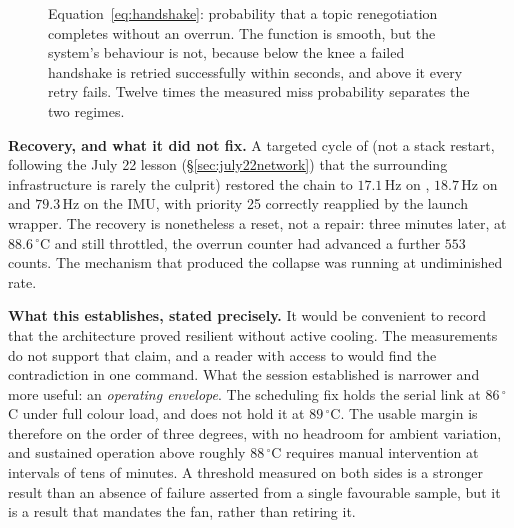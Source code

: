 \begin{figure}[htbp]
\centering
{}
\caption[Handshake cliff]{Equation~\ref{eq:handshake}: probability that a
 topic renegotiation completes without an overrun. The
function is smooth, but the system's behaviour is not, because below the knee
a failed handshake is retried successfully within seconds, and above it every
retry fails. Twelve times the measured miss probability separates the two
regimes.}
\label{fig:july30cliff}
\end{figure}

\noindent\textbf{Recovery, and what it did not fix.} A targeted
 cycle of  (not a stack restart, following
the July 22 lesson (\S\ref{sec:july22network}) that the surrounding
infrastructure is rarely the culprit) restored the chain to $17.1$\,Hz on
, $18.7$\,Hz on  and $79.3$\,Hz on the
IMU, with  priority 25 correctly reapplied by the launch
wrapper. The recovery is nonetheless a reset, not a repair: three minutes
later, at $88.6\,^\circ$C and still throttled, the overrun counter had
advanced a further $553$ counts. The mechanism that produced the collapse was
running at undiminished rate.

\noindent\textbf{What this establishes, stated precisely.} It would be
convenient to record that the architecture proved resilient without active
cooling. The measurements do not support that claim, and a reader with access
to  would find the contradiction in one command. What
the session established is narrower and more useful: an \emph{operating
envelope}. The scheduling fix holds the serial link at $86\,^\circ$C under
full colour load, and does not hold it at $89\,^\circ$C. The usable margin is
therefore on the order of three degrees, with no headroom for ambient
variation, and sustained operation above roughly $88\,^\circ$C requires manual
intervention at intervals of tens of minutes. A threshold measured on both
sides is a stronger result than an absence of failure asserted from a single
favourable sample, but it is a result that mandates the fan, rather than
retiring it.

